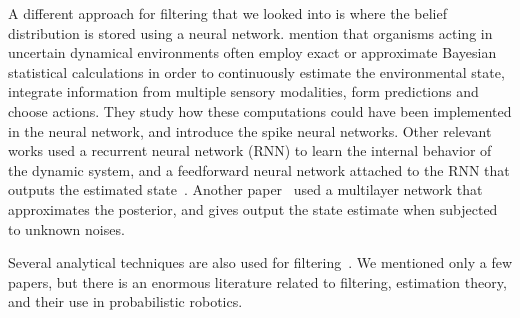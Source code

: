 A different approach for filtering that we looked into is where the belief distribution is stored using a neural network. \cite{neuspike1} mention that organisms acting in uncertain dynamical environments often employ exact or approximate Bayesian statistical calculations in order to continuously estimate the environmental state, integrate information from multiple sensory modalities, form predictions and choose actions. They study how these computations could have been implemented in the neural network, and introduce the spike neural networks. Other relevant works used a recurrent neural network (RNN) to learn the internal behavior of the dynamic system, and a feedforward neural network attached to the RNN that outputs the estimated state~\cite{neu5,neu1,neu2}. Another paper~\cite{neu4} used a multilayer network that approximates the posterior, and gives output the state estimate when subjected to unknown noises.

Several analytical techniques are also used for filtering~\cite{anl1,anl2,anl3}. We mentioned only a few papers, but there is an enormous literature related to filtering, estimation theory, and their use in probabilistic robotics. 